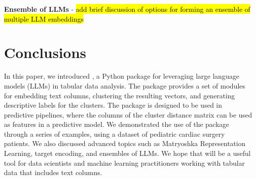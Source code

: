 \documentclass[article]{jss}
\begin{document}

\textbf{Ensemble of LLMs} - \hl{add brief discussion of options for forming an ensemble of multiple LLM embeddings}

\section{Conclusions} \label{sec:conclusions}

In this paper, we introduced , a Python package for leveraging large language models (LLMs) in tabular data analysis. The package provides a set of modules for embedding text columns, clustering the resulting vectors, and generating descriptive labels for the clusters. The package is designed to be used in predictive pipelines, where the columns of the cluster distance matrix can be used as features in a predictive model. We demonstrated the use of the package through a series of examples, using a dataset of pediatric cardiac surgery patients. We also discussed advanced topics such as Matryoshka Representation Learning, target encoding, and ensembles of LLMs. We hope that  will be a useful tool for data scientists and machine learning practitioners working with tabular data that includes text columns.


\end{document}
